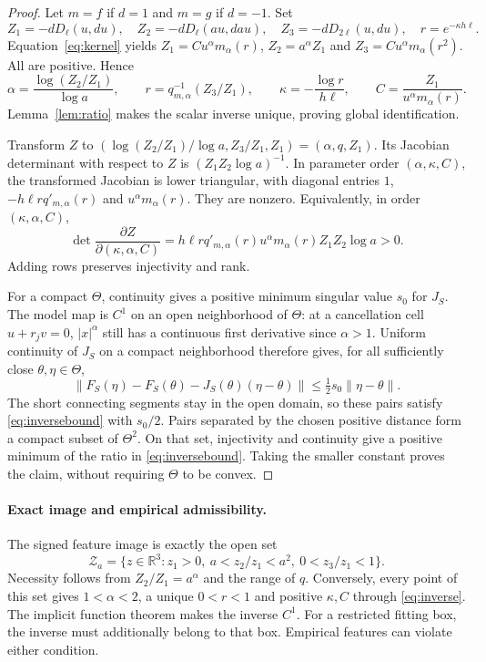 \documentclass[11pt,a4paper]{article}
\theoremstyle{remark}\newtheorem{remark}[theorem]{Remark}
\newcommand{\R}{\mathbb R}\newcommand{\norm}[1]{\left\lVert#1\right\rVert}
\begin{document}
\begin{proof}
Let $m=f$ if $d=1$ and $m=g$ if $d=-1$. Set
\[
Z_1=-dD_\ell(u,du),\quad Z_2=-dD_\ell(au,dau),\quad
Z_3=-dD_{2\ell}(u,du),\quad r=e^{-\kappa h\ell}.
\]
Equation~\eqref{eq:kernel} yields
$Z_1=Cu^\alpha m_\alpha(r)$, $Z_2=a^\alpha Z_1$ and
$Z_3=Cu^\alpha m_\alpha(r^2)$. All are positive. Hence
\begin{equation}\label{eq:inverse}
\alpha=\frac{\log(Z_2/Z_1)}{\log a},\qquad
r=q_{m,\alpha}^{-1}(Z_3/Z_1),\qquad
\kappa=-\frac{\log r}{h\ell},\qquad
C=\frac{Z_1}{u^\alpha m_\alpha(r)}.
\end{equation}
Lemma~\ref{lem:ratio} makes the scalar inverse unique, proving global identification.

Transform $Z$ to $(\log(Z_2/Z_1)/\log a,Z_3/Z_1,Z_1)=(\alpha,q,Z_1)$.
Its Jacobian determinant with respect to $Z$ is $(Z_1Z_2\log a)^{-1}$.
In parameter order $(\alpha,\kappa,C)$, the transformed Jacobian is lower triangular, with diagonal entries
$1$, $-h\ell r q'_{m,\alpha}(r)$ and $u^\alpha m_\alpha(r)$.
They are nonzero. Equivalently, in order $(\kappa,\alpha,C)$,
\begin{equation}\label{eq:det}
\det\frac{\partial Z}{\partial(\kappa,\alpha,C)}
=h\ell r q'_{m,\alpha}(r)u^\alpha m_\alpha(r)Z_1Z_2\log a>0.
\end{equation}
Adding rows preserves injectivity and rank.

For a compact $\Theta$, continuity gives a positive minimum singular value $s_0$ for $J_S$. The model map is $C^1$ on an open neighborhood of $\Theta$: at a cancellation cell $u+r_jv=0$, $|x|^\alpha$ still has a continuous first derivative since $\alpha>1$.
Uniform continuity of $J_S$ on a compact neighborhood therefore gives, for all sufficiently close $\theta,\eta\in\Theta$,
\[
\norm{F_S(\eta)-F_S(\theta)-J_S(\theta)(\eta-\theta)}
\le \tfrac12s_0\norm{\eta-\theta}.
\]
The short connecting segments stay in the open domain, so these pairs satisfy \eqref{eq:inversebound} with $s_0/2$. Pairs separated by the chosen positive distance form a compact subset of $\Theta^2$. On that set, injectivity and continuity give a positive minimum of the ratio in \eqref{eq:inversebound}. Taking the smaller constant proves the claim, without requiring $\Theta$ to be convex.
\end{proof}

\paragraph{Exact image and empirical admissibility.}
The signed feature image is exactly the open set
\begin{equation}\label{eq:image}
\mathcal Z_a=\{z\in\R^3:z_1>0,\ a<z_2/z_1<a^2,\ 0<z_3/z_1<1\}.
\end{equation}
Necessity follows from $Z_2/Z_1=a^\alpha$ and the range of $q$. Conversely, every point of this set gives $1<\alpha<2$, a unique $0<r<1$ and positive $\kappa,C$ through \eqref{eq:inverse}. The implicit function theorem makes the inverse $C^1$. For a restricted fitting box, the inverse must additionally belong to that box. Empirical features can violate either condition.
\end{document}
